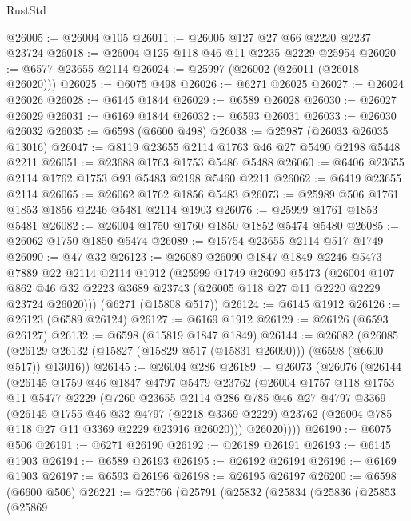 \begin{lexlean}{RustStd}
\begin{coremodule}
@26005 := @26004 @105
@26011 := @26005 @127 @27 @66 @2220 @2237 @23724
@26018 := @26004 @125 @118 @46 @11 @2235 @2229 @25954
@26020 := @6577 @23655 @2114
@26024 := @25997 (@26002 (@26011 (@26018 @26020)))
@26025 := @6075 @498
@26026 := @6271 @26025
@26027 := @26024 @26026
@26028 := @6145 @1844
@26029 := @6589 @26028
@26030 := @26027 @26029
@26031 := @6169 @1844
@26032 := @6593 @26031
@26033 := @26030 @26032
@26035 := @6598 (@6600 @498)
@26038 := @25987 (@26033 @26035 @13016)
@26047 := @8119 @23655 @2114 @1763 @46 @27 @5490 @2198 @5448 @2211
@26051 := @23688 @1763 @1753 @5486 @5488
@26060 := @6406 @23655 @2114 @1762 @1753 @93 @5483 @2198 @5460 @2211
@26062 := @6419 @23655 @2114
@26065 := @26062 @1762 @1856 @5483
@26073 := @25989 @506 @1761 @1853 @1856 @2246 @5481 @2114 @1903
@26076 := @25999 @1761 @1853 @5481
@26082 := @26004 @1750 @1760 @1850 @1852 @5474 @5480
@26085 := @26062 @1750 @1850 @5474
@26089 := @15754 @23655 @2114 @517 @1749
@26090 := @47 @32
@26123 := @26089
    @26090
    @1847
    @1849
    @2246
    @5473
    @7889
    @22
    @2114
    @2114
    @1912
    (@25999
      @1749
      @26090
      @5473
      (@26004 @107 @862 @46 @32 @2223 @3689 @23743 (@26005 @118 @27 @11 @2220 @2229 @23724 @26020)))
    (@6271 (@15808 @517))
@26124 := @6145 @1912
@26126 := @26123 (@6589 @26124)
@26127 := @6169 @1912
@26129 := @26126 (@6593 @26127)
@26132 := @6598 (@15819 @1847 @1849)
@26144 := @26082
    (@26085 (@26129 @26132 (@15827 (@15829 @517 (@15831 @26090))) (@6598 (@6600 @517)) @13016))
@26145 := @26004 @286
@26189 := @26073
    (@26076
      (@26144
        (@26145
          @1759
          @46
          @1847
          @4797
          @5479
          @23762
          (@26004
            @1757
            @118
            @1753
            @11
            @5477
            @2229
            (@7260
              @23655
              @2114
              @286
              @785
              @46
              @27
              @4797
              @3369
              (@26145
                @1755
                @46
                @32
                @4797
                (@2218 @3369 @2229)
                @23762
                (@26004 @785 @118 @27 @11 @3369 @2229 @23916 @26020)))
            @26020))))
@26190 := @6075 @506
@26191 := @6271 @26190
@26192 := @26189 @26191
@26193 := @6145 @1903
@26194 := @6589 @26193
@26195 := @26192 @26194
@26196 := @6169 @1903
@26197 := @6593 @26196
@26198 := @26195 @26197
@26200 := @6598 (@6600 @506)
@26221 := @25766
    (@25791
      (@25832
        (@25834
          (@25836
            (@25853
              (@25869

\end{coremodule}
\end{lexlean}
